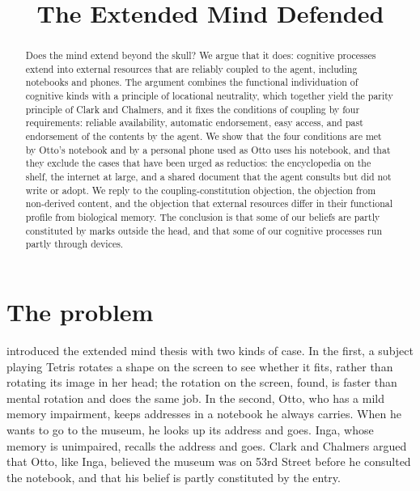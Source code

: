 \documentclass{situationist-preprint}
\title{The Extended Mind Defended}
\begin{document}
\maketitle

\begin{abstract}
Does the mind extend beyond the skull? We argue that it does: cognitive processes extend into external resources that are reliably coupled to the agent, including notebooks and phones. The argument combines the functional individuation of cognitive kinds with a principle of locational neutrality, which together yield the parity principle of Clark and Chalmers, and it fixes the conditions of coupling by four requirements: reliable availability, automatic endorsement, easy access, and past endorsement of the contents by the agent. We show that the four conditions are met by Otto's notebook and by a personal phone used as Otto uses his notebook, and that they exclude the cases that have been urged as reductios: the encyclopedia on the shelf, the internet at large, and a shared document that the agent consults but did not write or adopt. We reply to the coupling-constitution objection, the objection from non-derived content, and the objection that external resources differ in their functional profile from biological memory. The conclusion is that some of our beliefs are partly constituted by marks outside the head, and that some of our cognitive processes run partly through devices.
\end{abstract}

\section{The problem}

\citet{ClarkChalmers1998} introduced the extended mind thesis with two kinds of case. In the first, a subject playing Tetris rotates a shape on the screen to see whether it fits, rather than rotating its image in her head; the rotation on the screen, \citet{KirshMaglio1994} found, is faster than mental rotation and does the same job. In the second, Otto, who has a mild memory impairment, keeps addresses in a notebook he always carries. When he wants to go to the museum, he looks up its address and goes. Inga, whose memory is unimpaired, recalls the address and goes. Clark and Chalmers argued that Otto, like Inga, believed the museum was on 53rd Street before he consulted the notebook, and that his belief is partly constituted by the entry.
\end{document}
